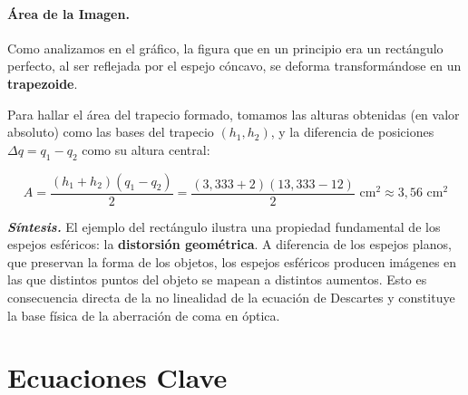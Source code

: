 \documentclass[12pt, a4paper]{article}
\theoremstyle{definition}
\begin{document}
\paragraph{Área de la Imagen.}
Como analizamos en el gráfico, la figura que en un principio era un rectángulo perfecto, al ser reflejada por el espejo cóncavo, se deforma transformándose en un \textbf{trapezoide}.

Para hallar el área del trapecio formado, tomamos las alturas obtenidas (en valor absoluto) como las bases del trapecio \((h_1, h_2)\), y la diferencia de posiciones \(\Delta q = q_1 - q_2\) como su altura central:

\begin{equation}
  A = \frac{(h_1 + h_2)(q_1 - q_2)}{2} = \frac{(3{,}333 + 2)(13{,}333 - 12)}{2} \text{ cm}^2 \approx 3{,}56 \text{ cm}^2
  \label{eq:rect_area}
\end{equation}

\textit{\textbf{Síntesis.}} El ejemplo del rectángulo ilustra una propiedad fundamental de los espejos esféricos: la \textbf{distorsión geométrica}. A diferencia de los espejos planos, que preservan la forma de los objetos, los espejos esféricos producen imágenes en las que distintos puntos del objeto se mapean a distintos aumentos. Esto es consecuencia directa de la no linealidad de la ecuación de Descartes y constituye la base física de la aberración de coma en óptica.

\section*{Ecuaciones Clave}
\end{document}
